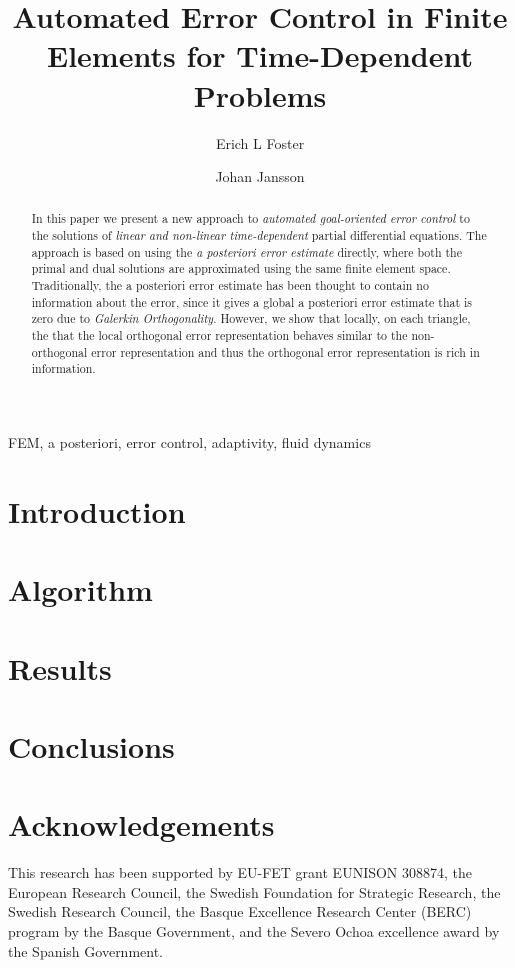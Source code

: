 \documentclass[a4paper]{article}
\author[1]{Erich L Foster}
\author[1,2]{Johan Jansson}
\affil[1]{Basque Center for Applied Mathematics, Bilbao, Basque Country -- Spain}
\affil[2]{CSC, KTH Royal Institute of Technology, Stockholm, Sweden}
\title{Automated Error Control in Finite Elements for Time-Dependent Problems}
\begin{document}
  \maketitle
  \tableofcontents
  \begin{abstract}
    In this paper we present a new approach to \emph{automated goal-oriented
    error control} to the solutions of \emph{linear and non-linear
    time-dependent} partial differential equations. The approach is based
    on using the \emph{a posteriori error estimate} directly, where both the
    primal and dual solutions are approximated using the same finite element
    space.  Traditionally, the a posteriori error estimate has been thought to
    contain no information about the error, since it gives a global a
    posteriori error estimate that is zero due to \emph{Galerkin
    Orthogonality}. However, we show that locally, on each triangle, the that
    the local orthogonal error representation behaves similar to the
    non-orthogonal error representation and thus the orthogonal error
    representation is rich in information.
  \end{abstract}
  \begin{keywords}
    FEM, a posteriori, error control, adaptivity, fluid dynamics
  \end{keywords}

  \section{Introduction} \label{sec:Intro}
  

  \section{Algorithm} \label{sec:Algorithm}
  

  \section{Results} \label{sec:Results}
  

  \section{Conclusions} \label{sec:Conclusions}
  

  \section*{Acknowledgements}
  This research has been supported by EU-FET grant EUNISON 308874, the European
  Research Council, the Swedish Foundation for Strategic Research, the Swedish
  Research Council, the Basque Excellence Research Center (BERC) program by
  the Basque Government, and the Severo Ochoa excellence award by the Spanish
  Government.

  \printbibliography
\end{document}
